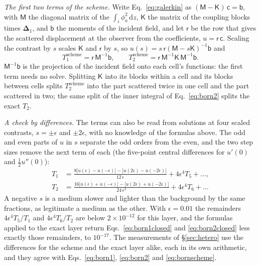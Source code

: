 \documentclass[preprint,review,12pt]{elsarticle}
\newcommand{\bD}{\boldsymbol{\Delta}}
\newcommand{\dd}{\mathrm{d}}
\begin{document}
\emph{The first two terms of the scheme.} Write Eq.~\eqref{eq:galerkin} as
$(\mathsf{M}-\mathsf{K})\,\mathsf{c}=\mathsf{b}$, with $\mathsf{M}$ the diagonal matrix of the
$\int_i\phi_a^2\,\dd z$, $\mathsf{K}$ the matrix of the coupling blocks times $\bD_1$, and $\mathsf{b}$ the
moments of the incident field, and let $\mathsf{r}$ be the row that gives the scattered displacement at
the observer from the coefficients, $u=\mathsf{r}\,\mathsf{c}$. Scaling the contrast by $s$ scales
$\mathsf{K}$ and $\mathsf{r}$ by $s$, so $u(s)=s\,\mathsf{r}(\mathsf{M}-s\mathsf{K})^{-1}\mathsf{b}$ and
\begin{equation}\label{eq:bornscheme}
  T_1^{\text{scheme}}=\mathsf{r}\,\mathsf{M}^{-1}\mathsf{b},\qquad
  T_2^{\text{scheme}}=\mathsf{r}\,\mathsf{M}^{-1}\mathsf{K}\,\mathsf{M}^{-1}\mathsf{b}.
\end{equation}
$\mathsf{M}^{-1}\mathsf{b}$ is the projection of the incident field onto each cell's functions: the
first term needs no solve. Splitting $\mathsf{K}$ into its blocks within a cell and its blocks between
cells splits $T_2^{\text{scheme}}$ into the part scattered twice in one cell and the part scattered in
two; the same split of the inner integral of Eq.~\eqref{eq:born2} splits the exact $T_2$.

\emph{A check by differences.} The terms can also be read from solutions at four scaled contrasts,
$s=\pm\epsilon$ and $\pm2\epsilon$, with no knowledge of the formulas above. The odd and even parts of
$u$ in $s$ separate the odd orders from the even, and the two step sizes remove the next term of each
(the five-point central differences for $u'(0)$ and $\tfrac12u''(0)$):
\begin{equation}\label{eq:isolate}
\begin{aligned}
  T_1&=\frac{8\bigl[u(\epsilon)-u(-\epsilon)\bigr]-\bigl[u(2\epsilon)-u(-2\epsilon)\bigr]}{12\,\epsilon}
      +4\epsilon^4T_5+\dots,\\[4pt]
  T_2&=\frac{16\bigl[u(\epsilon)+u(-\epsilon)\bigr]-\bigl[u(2\epsilon)+u(-2\epsilon)\bigr]}{24\,\epsilon^2}
      +4\epsilon^4T_6+\dots
\end{aligned}
\end{equation}
A negative $s$ is a medium slower and lighter than the background by the same fractions, as legitimate
a medium as the other. With $\epsilon=0.01$ the remainders $4\epsilon^4T_5/T_1$ and $4\epsilon^4T_6/T_2$
are below $2\times10^{-12}$ for this layer, and the formulas applied to the exact layer return
Eqs.~\eqref{eq:born1closed} and \eqref{eq:born2closed} less exactly those remainders, to $10^{-17}$.
The measurements of \S\ref{sec:hetero} use the differences for the scheme and the exact layer alike, each in its own
arithmetic, and they agree with Eqs.~\eqref{eq:born1}, \eqref{eq:born2} and \eqref{eq:bornscheme}.
\end{document}
